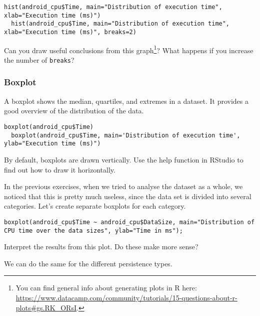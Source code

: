 \begin{lstlisting}[breaklines=true]
  hist(android_cpu$Time, main="Distribution of execution time", xlab="Execution time (ms)")
  hist(android_cpu$Time, main="Distribution of execution time", xlab="Execution time (ms)", breaks=2)
\end{lstlisting}

\begin{exercise}
  Can you draw useful conclusions from this graph\footnote{You can find general info about generating plots in R here:  \url{https://www.datacamp.com/community/tutorials/15-questions-about-r-plots\#gs.RK_ORsI}.}? 
  What happens if you increase the number of \texttt{breaks}?
\end{exercise}

\subsubsection{Boxplot}

A boxplot shows the median, quartiles, and extremes in a dataset. 
It provides a good overview of the distribution of the data.

\begin{lstlisting}[breaklines=true]
  boxplot(android_cpu$Time)
  boxplot(android_cpu$Time, main='Distribution of execution time', ylab="Execution time (ms)")
\end{lstlisting} 

\begin{exercise}
  By default, boxplots are drawn vertically. Use the help function in RStudio to find out how to draw it horizontally.
\end{exercise}

In the previous exercises, when we tried to analyse the dataset as a whole, we noticed that this is pretty much useless, since the data set is divided into several categories. 
Let's create separate boxplots for each category.

\begin{lstlisting}[breaklines=true]
  boxplot(android_cpu$Time ~ android_cpu$DataSize, main="Distribution of CPU time over the data sizes", ylab="Time in ms");
\end{lstlisting}

\begin{exercise}
	\label{ex:boxplot}
  Interpret the results from this plot. Do these make more sense?
\end{exercise}

We can do the same for the different persistence types.

